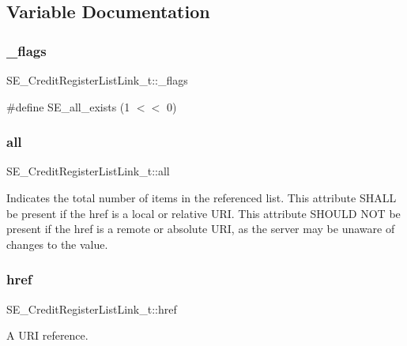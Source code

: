 \subsection{Variable Documentation}
\mbox{\label{group__CreditRegisterListLink_ga69524ed9bcb30aa661753e0db081fe05}} 
\subsubsection{\texorpdfstring{\+\_\+flags}{\_flags}}
{\footnotesize\ttfamily S\+E\+\_\+\+Credit\+Register\+List\+Link\+\_\+t\+::\+\_\+flags}

\#define S\+E\+\_\+all\+\_\+exists (1 $<$$<$ 0) \mbox{\label{group__CreditRegisterListLink_gaef19d5848be3a43aac4590b88bcb8b45}} 
\subsubsection{\texorpdfstring{all}{all}}
{\footnotesize\ttfamily S\+E\+\_\+\+Credit\+Register\+List\+Link\+\_\+t\+::all}

Indicates the total number of items in the referenced list. This attribute S\+H\+A\+LL be present if the href is a local or relative U\+RI. This attribute S\+H\+O\+U\+LD N\+OT be present if the href is a remote or absolute U\+RI, as the server may be unaware of changes to the value. \mbox{\label{group__CreditRegisterListLink_ga95b64e9f140f59d8166045d43026c5e0}} 
\subsubsection{\texorpdfstring{href}{href}}
{\footnotesize\ttfamily S\+E\+\_\+\+Credit\+Register\+List\+Link\+\_\+t\+::href}

A U\+RI reference. 